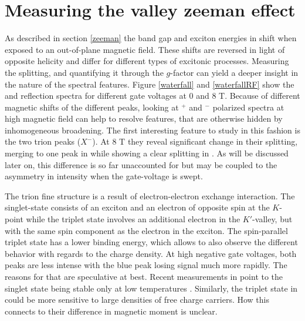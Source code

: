 \section{Measuring the valley zeeman effect}\label{zeemanspec}

As described in section \ref{zeeman} the band gap and exciton energies in \tmds shift when exposed to an out-of-plane magnetic field. These shifts are reversed in light of opposite helicity and differ for different types of excitonic processes. Measuring the splitting, and quantifying it through the $g$-factor can yield a deeper insight in the nature of the spectral features. Figure \ref{waterfall} and \ref{waterfallRF} show the \pl and reflection spectra for different gate voltages at 0 and 8 T. Because of different magnetic shifts of the different peaks, looking at \sigma$^+$ and \sigma$^-$ polarized spectra at high magnetic field can help to resolve features, that are otherwise hidden by inhomogeneous broadening. The first interesting feature to study in this fashion is the two trion peaks ($X^-$). At 8 T they reveal significant change in their splitting, merging to one peak in \sigp while showing a clear splitting in \sigm. As will be discussed later on, this difference is so far unaccounted for but may be coupled to the asymmetry in intensity when the gate-voltage is swept.

The trion fine structure is a result of electron-electron exchange interaction. The singlet-state consists of an exciton and an electron of opposite spin at the $K$-point while the triplet state involves an additional electron in the $K'$-valley, but with the same spin component as the electron in the exciton. The spin-parallel triplet state has a lower binding energy, which allows to also observe the different behavior with regards to the charge density. At high negative gate voltages, both peaks are less intense with the blue peak losing signal much more rapidly. The reasons for that are speculative at best. Recent measurements in \ws point to the singlet state being stable only at low temperatures \cite{vaclavkova_singlet_2018}. Similarly, the triplet state in \wse could be more sensitive to large densities of free charge carriers. How this connects to their difference in magnetic moment is unclear.


